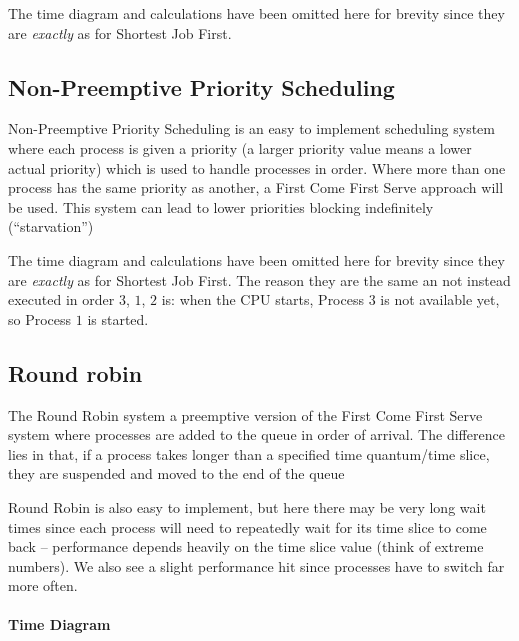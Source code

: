 \begin{note}
	The time diagram and calculations have been omitted here for brevity since they are \emph{exactly} as for Shortest Job First.
\end{note}

\subsection{Non-Preemptive Priority Scheduling}\label{sub:non_preemptive_priority_scheduling}

Non-Preemptive Priority Scheduling is an easy to implement scheduling system where each process is given a priority (a larger priority value means a lower actual priority) which is used to handle processes in order.
Where more than one process has the same priority as another, a First Come First Serve approach will be used.
This system can lead to lower priorities blocking indefinitely (``starvation'')

\begin{note}
	The time diagram and calculations have been omitted here for brevity since they are \emph{exactly} as for Shortest Job First.
	The reason they are the same an not instead executed in order \(3\), \(1\), \(2\) is: when the CPU starts, Process \(3\) is not available yet, so Process \(1\) is started.
\end{note}

\subsection{Round robin}\label{sub:round_robin}

The Round Robin system a preemptive version of the First Come First Serve system where processes are added to the queue in order of arrival.
The difference lies in that, if a process takes longer than a specified time quantum/time slice, they are suspended and moved to the end of the queue

Round Robin is also easy to implement, but here there may be very long wait times since each process will need to repeatedly wait for its time slice to come back -- performance depends heavily on the time slice value (think of extreme numbers).
We also see a slight performance hit since processes have to switch far more often.

\paragraph{Time Diagram}\label{par:time_diagram_3}

